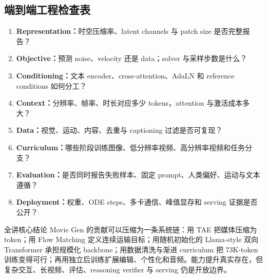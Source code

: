 \subsection{端到端工程检查表}

\begin{enumerate}
  \item \textbf{Representation：}时空压缩率、latent channels 与 patch size 是否完整报告？
  \item \textbf{Objective：}预测 noise、velocity 还是 data；solver 与采样步数是什么？
  \item \textbf{Conditioning：}文本 encoder、cross-attention、AdaLN 和 reference conditions 如何分工？
  \item \textbf{Context：}分辨率、帧率、时长对应多少 tokens，attention 与激活成本多大？
  \item \textbf{Data：}视觉、运动、内容、去重与 captioning 过滤是否可复现？
  \item \textbf{Curriculum：}哪些阶段训练图像、低分辨率视频、高分辨率视频和任务分支？
  \item \textbf{Evaluation：}是否同时报告失败样本、固定 prompt、人类偏好、运动与文本遵循？
  \item \textbf{Deployment：}权重、ODE steps、多卡通信、峰值显存和 serving 证据是否公开？
\end{enumerate}

\begin{importantbox}{全讲核心结论}
Movie Gen 的贡献可以压缩为一条系统链：用 TAE 把媒体压缩为 token；用 Flow Matching 定义连续运输目标；用随机初始化的 Llama-style 双向 Transformer 承担规模化 backbone；用数据清洗与渐进 curriculum 把 73K-token 训练变得可行；再用独立后训练扩展编辑、个性化和音频。能力提升真实存在，但复杂交互、长视频、评估、reasoning verifier 与 serving 仍是开放边界。
\end{importantbox}

